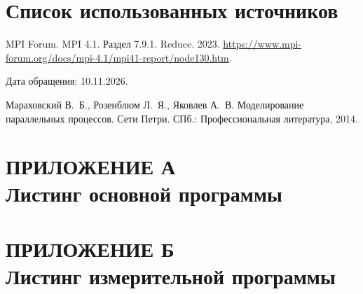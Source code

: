 \documentclass[14pt,a4paper]{extarticle}
\begin{document}
\section{Список использованных источников}

\begin{enumerate}[label={[\arabic*]},leftmargin=1.25cm]
\item MPI Forum. MPI 4.1. Раздел 7.9.1. Reduce. 2023.
\url{https://www.mpi-forum.org/docs/mpi-4.1/mpi41-report/node130.htm}.
\par Дата обращения: 10.11.2026.
\item Мараховский В.~Б., Розенблюм Л.~Я., Яковлев А.~В.
Моделирование параллельных процессов. Сети Петри.
СПб.: Профессиональная литература, 2014.
\end{enumerate}

\clearpage
{}
\section*{ПРИЛОЖЕНИЕ А\\Листинг основной программы}

\clearpage
{}
\section*{ПРИЛОЖЕНИЕ Б\\Листинг измерительной программы}
\end{document}
